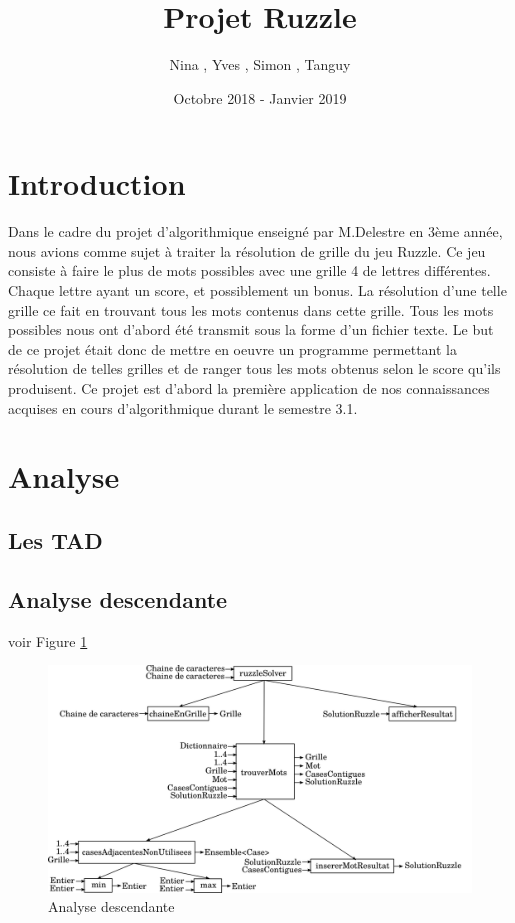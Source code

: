 \documentclass[a4paper]{article}
\title{Projet Ruzzle}
\author{Nina \noun{Lardiere}, Yves \noun{Le Guennec}, Simon \noun{Lebeaud}, Tanguy \noun{Leclerc}}
\date{Octobre 2018 - Janvier 2019}
\begin{document}
	\maketitle
	\tableofcontents
	\newpage
	\section{Introduction}
	Dans le cadre du projet d'algorithmique enseigné par M.Delestre en 3ème année, nous avions comme sujet à traiter la résolution de grille du jeu Ruzzle. Ce jeu consiste à faire le plus de mots possibles avec une grille 4 de lettres différentes. Chaque lettre ayant un score, et possiblement un bonus. La résolution d'une telle grille ce fait en trouvant tous les mots contenus dans cette grille.
	Tous les mots possibles nous ont d'abord été transmit sous la forme d'un fichier texte. Le but de ce projet était donc de mettre en oeuvre un programme permettant la résolution de telles grilles et de ranger tous les mots obtenus selon le score qu'ils produisent. Ce projet est d'abord la première application de nos connaissances acquises en cours d'algorithmique durant le semestre 3.1.

	\section{Analyse}
		\subsection{Les TAD}
			

		\subsection{Analyse descendante}
			voir Figure \ref{fig:AD}
			\begin{figure}
				\centering \includegraphics[width=1\textwidth]{./analyseDescendante/analyseDescendante}
				\caption{\label{fig:AD}Analyse descendante}
			\end{figure}
\end{document}
